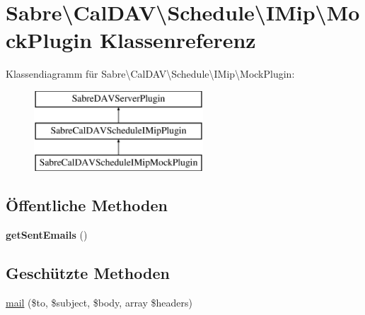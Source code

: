 \hypertarget{class_sabre_1_1_cal_d_a_v_1_1_schedule_1_1_i_mip_1_1_mock_plugin}{}\section{Sabre\textbackslash{}Cal\+D\+AV\textbackslash{}Schedule\textbackslash{}I\+Mip\textbackslash{}Mock\+Plugin Klassenreferenz}
\label{class_sabre_1_1_cal_d_a_v_1_1_schedule_1_1_i_mip_1_1_mock_plugin}
Klassendiagramm für Sabre\textbackslash{}Cal\+D\+AV\textbackslash{}Schedule\textbackslash{}I\+Mip\textbackslash{}Mock\+Plugin\+:\begin{figure}[H]
\begin{center}
\leavevmode
\includegraphics[height=3.000000cm]{class_sabre_1_1_cal_d_a_v_1_1_schedule_1_1_i_mip_1_1_mock_plugin}
\end{center}
\end{figure}
\subsection*{Öffentliche Methoden}
\begin{DoxyCompactItemize}
\item 
\mbox{\label{class_sabre_1_1_cal_d_a_v_1_1_schedule_1_1_i_mip_1_1_mock_plugin_afd29ed91262d68ca72d883363b1b96c5}} 
{\bfseries get\+Sent\+Emails} ()
\end{DoxyCompactItemize}
\subsection*{Geschützte Methoden}
\begin{DoxyCompactItemize}
\item 
\mbox{\hyperlink{class_sabre_1_1_cal_d_a_v_1_1_schedule_1_1_i_mip_1_1_mock_plugin_a6b93fc1f0d5ac4face750441e6a9465b}{mail}} (\$to, \$subject, \$body, array \$headers)
\end{DoxyCompactItemize}

